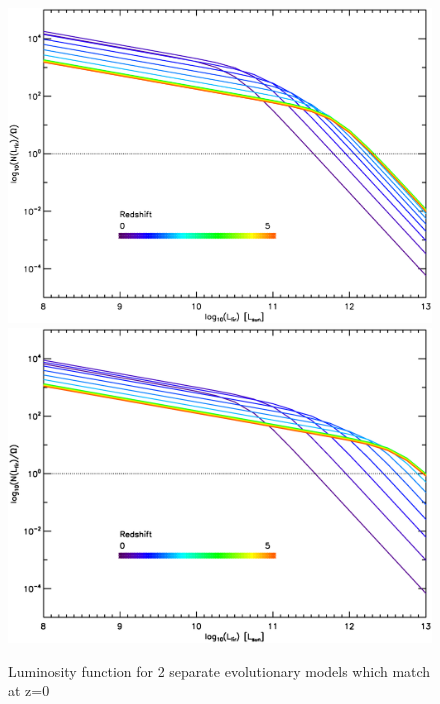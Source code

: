 \documentclass[twocolumn,letterpaper,10pt]{article}
\begin{document}
\begin{figure}
\centering
\includegraphics[width=5.5in]{lumfunct.eps}
\includegraphics[width=5.5in]{sim_lumfunct.eps}
\caption{Luminosity function for 2 separate evolutionary models which match at z=0}
\label{lf}
\end{figure}
\end{document}
